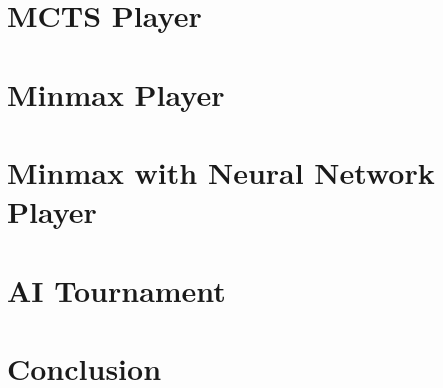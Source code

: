 \documentclass[12pt,a4paper,twoside,openright]{book}
\begin{document}



\chapter{MCTS Player}
\label{ch:mcts}


\chapter{Minmax Player}
\label{ch:minmax}


\chapter{Minmax with Neural Network Player}
\label{ch:nnue}


\chapter{AI Tournament}
\label{ch:tournament}


\chapter{Conclusion}
\label{ch:conclusion}


\end{document}
